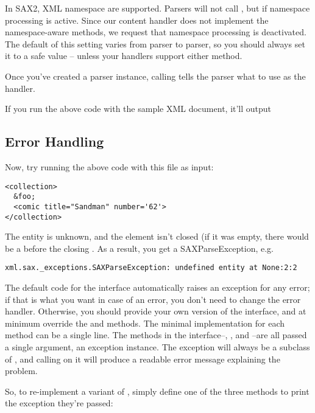 \documentclass{howto}
\newcommand{\element}[1]{\code{#1}}
\begin{document}
In SAX2, XML namespace are supported. Parsers will not call
, but  if namespace
processing is active. Since our content handler does not implement the
namespace-aware methods, we request that namespace processing is
deactivated. The default of this setting varies from parser to parser,
so you should always set it to a safe value -- unless your handlers
support either method.

Once you've created a parser instance, calling
 tells the parser what to use as the
handler.

If you run the above code with the sample XML document, it'll output

\subsection{Error Handling}

Now, try running the above code with this file as input:
\begin{verbatim}
<collection>
  &foo;
  <comic title="Sandman" number='62'>
</collection>
\end{verbatim}

The  entity is unknown, and the \element{comic} element
isn't closed (if it was empty, there would be a \samp{/} before the
closing \samp{>}. As a result, you get a SAXParseException, e.g.

\begin{verbatim}
xml.sax._exceptions.SAXParseException: undefined entity at None:2:2
\end{verbatim}

The default code for the  interface automatically
raises an exception for any error; if that is what you want in case of
an error, you don't need to change the error handler.  Otherwise, you
should provide your own version of the  interface,
and at minimum override the  and 
methods.  The minimal implementation for each method can be a single
line.  The methods in the 
interface--, , and
--are all passed a single argument, an exception
instance.  The exception will always be a subclass of
, and calling  on it will produce
a readable error message explaining the problem.

So, to re-implement a variant of , simply define
one of the three methods to print the exception they're passed:
\end{document}
